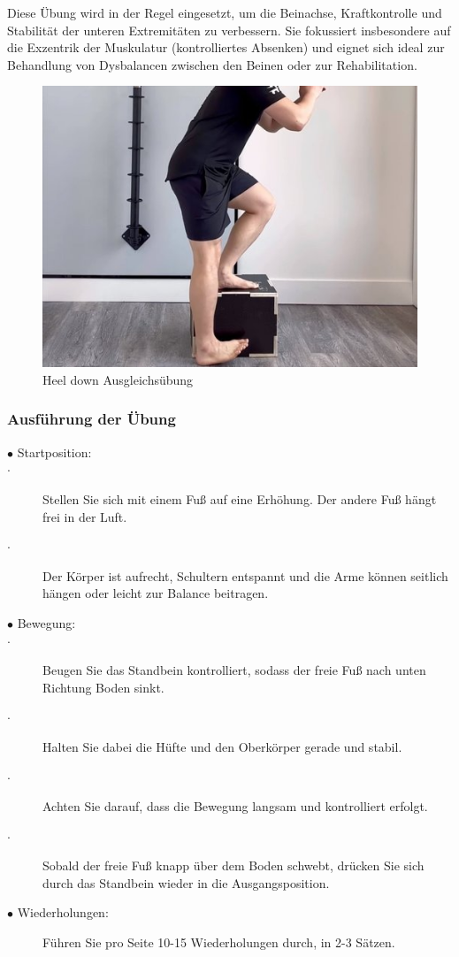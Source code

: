 Diese Übung wird in der Regel eingesetzt, um die Beinachse, Kraftkontrolle und Stabilität der unteren Extremitäten zu verbessern. Sie fokussiert insbesondere auf die Exzentrik der Muskulatur (kontrolliertes Absenken) und eignet sich ideal zur Behandlung von Dysbalancen zwischen den Beinen oder zur Rehabilitation.

\begin{figure}[!]
    \centering
    \includegraphics[width=0.5\linewidth]{img/Heel-down-Uebung.jpg}
    \caption{Heel down Ausgleichsübung \cite{rehabhero}}
    \label{Heel-down-Ausgleichsübung}
\end{figure}

\subsubsection{Ausführung der Übung}

\begin{description}
    \item[$\bullet$ Startposition:]
        \item[$\cdot$ ] Stellen Sie sich mit einem Fuß auf eine Erhöhung. Der andere Fuß hängt frei in der Luft.
        \item[$\cdot$ ]Der Körper ist aufrecht, Schultern entspannt und die Arme können seitlich hängen oder leicht zur Balance beitragen.
     \item[$\bullet$ Bewegung:]
        \item[$\cdot$ ] Beugen Sie das Standbein kontrolliert, sodass der freie Fuß nach unten Richtung Boden sinkt.
        \item[$\cdot$ ]Halten Sie dabei die Hüfte und den Oberkörper gerade und stabil.
        \item[$\cdot$ ] Achten Sie darauf, dass die Bewegung langsam und kontrolliert erfolgt.
        \item[$\cdot$ ] Sobald der freie Fuß knapp über dem Boden schwebt, drücken Sie sich durch das Standbein wieder in die Ausgangsposition.
    \item[$\bullet$ Wiederholungen:]Führen Sie pro Seite 10-15 Wiederholungen durch, in 2-3 Sätzen.

\end{description}


